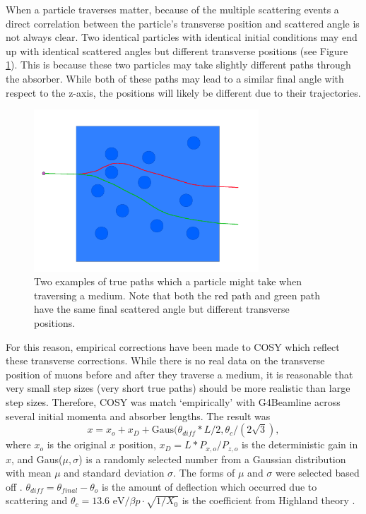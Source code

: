 %
%
\label{sec:COSYTransverseDisplacement}\par
When a particle traverses matter, because of the multiple scattering events a direct correlation between the particle's transverse position and scattered angle is not always clear. Two identical particles with identical initial conditions may end up with identical scattered angles but different transverse positions (see Figure \ref{fig:lateral_displacement}). This is because these two particles may take slightly different paths through the absorber. While both of these paths may lead to a similar final angle with respect to the z-axis, the positions will likely be different due to their trajectories.

\begin{figure}
  \centering
    \includegraphics[width=0.75\textwidth]{Figures/lateral_displacement} 
  \caption[Two examples of true paths.]{Two examples of true paths which a particle might take when traversing a medium. Note that both the red path and green path have the same final scattered angle but different transverse positions.}
  \label{fig:lateral_displacement}
\end{figure}

For this reason, empirical corrections have been made to COSY which reflect these transverse corrections. While there is no real data on the transverse position of muons before and after they traverse a medium, it is reasonable that very small step sizes (very short true paths) should be more realistic than large step sizes. Therefore, COSY was match `empirically' with G4Beamline across several initial momenta and absorber lengths. The result was
\begin{equation}\label{eqn:cosylatdis}
x = x_o + x_D+\text{Gaus}(\theta_{diff} *L/2,\theta_c /(2\sqrt{3}),
\end{equation}
where $x_o$ is the original $x$ position, $x_D = L*P_{x,o}/P_{z,o}$ is the deterministic  gain in $x$, and Gaus($\mu,\sigma$) is a randomly selected number from a Gaussian distribution with mean $\mu$ and standard deviation $\sigma$. The forms of $\mu$ and $\sigma$ were selected based off \cite{fernowAndGallardo}. $\theta_{diff}=\theta_{final}-\theta_o$ is the amount of deflection which occurred due to scattering and $\theta_c=13.6 \text{ eV}/\beta p \cdot \sqrt{1/X_0}$ is the coefficient from Highland theory \cite{highland}.


